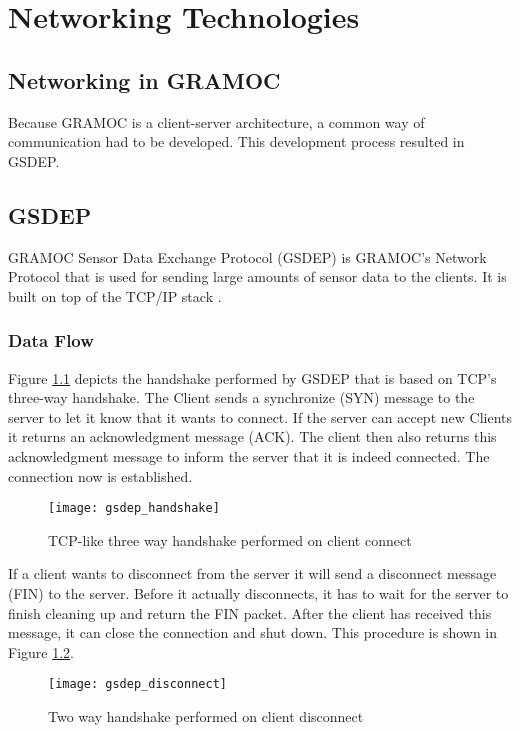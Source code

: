 \chapter{Networking Technologies}
\label{ch:networkingtechnologies}

\section{Networking in GRAMOC}

Because GRAMOC is a client-server architecture, a common way of communication had to be developed. This development process resulted in GSDEP.

\section{GSDEP}

GRAMOC Sensor Data Exchange Protocol (GSDEP) is GRAMOC's Network Protocol that is used for sending large amounts of sensor data to the clients. It is built on top of the TCP/IP stack \cite{rfc793, rfc791}.

\subsection{Data Flow}
\label{sec:networking_data-flow}

Figure \ref{fig:handshake} depicts the handshake performed by GSDEP that is based on TCP's three-way handshake. The Client sends a synchronize (SYN) message to the server to let it know that it wants to connect. If the server can accept new Clients it returns an acknowledgment message (ACK). The client then also returns this acknowledgment message to inform the server that it is indeed connected. The connection now is established.

\begin{figure}[H]
	\centering
	\texttt{[image: gsdep\_handshake]}
	\caption{TCP-like three way handshake performed on client connect}
	\label{fig:handshake}
\end{figure}

If a client wants to disconnect from the server it will send a disconnect message (FIN) to the server. Before it actually disconnects, it has to wait for the server to finish cleaning up and return the FIN packet. After the client has received this message, it can close the connection and shut down. This procedure is shown in Figure \ref{fig:disconnect}.

\begin{figure}[H]
	\centering
	\texttt{[image: gsdep\_disconnect]}
	\caption{Two way handshake performed on client disconnect}
	\label{fig:disconnect}
\end{figure}

